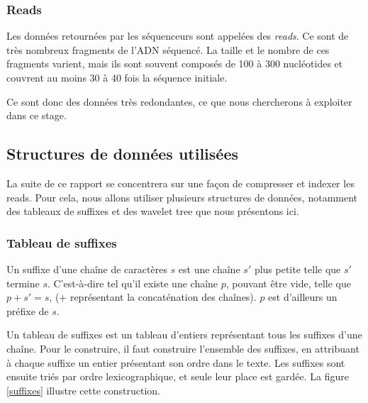 \subsubsection{Reads}
Les données retournées par les séquenceurs sont appelées des \emph{reads}. Ce sont de très nombreux fragments de l'ADN séquencé. La taille et le nombre de ces fragments varient, mais ils sont souvent composés de 100 à 300 nucléotides et couvrent au moins 30 à 40 fois la séquence initiale. 

Ce sont donc des données très redondantes, ce que nous chercherons à exploiter dans ce stage.


\subsection{Structures de données utilisées}
La suite de ce rapport se concentrera sur une façon de compresser et indexer les reads. Pour cela, nous allons utiliser plusieurs structures de données, notamment des tableaux de suffixes et des wavelet tree que nous présentons ici.

\subsubsection{Tableau de suffixes}
Un suffixe d'une chaîne de caractères $s$ est une chaîne $s'$ plus petite telle que $s'$ termine $s$. C'est-à-dire tel qu'il existe une chaîne $p$, pouvant être vide, telle que $p + s' = s$, ($+$ représentant la concaténation des chaînes). $p$ est d'ailleurs un préfixe de $s$.

Un tableau de suffixes est un tableau d'entiers représentant tous les suffixes d'une chaîne. Pour le construire, il faut construire l'ensemble des suffixes, en attribuant à chaque suffixe un entier présentant son ordre dans le texte. Les suffixes sont ensuite triés par ordre lexicographique, et seule leur place est gardée. La figure \ref{suffixes} illustre cette construction.

